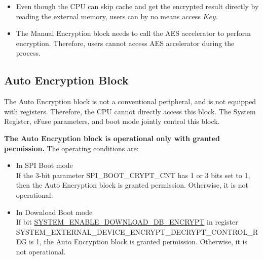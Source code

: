 \documentclass[main\_\_EN.tex]{subfiles}
\begin{document}
\begin{tiplisting}
\vspace{-2em}
\begin{itemize}
\item Even though the CPU can skip cache and get the encrypted result directly by reading the external memory, users can by no means access \begin{math}Key\end{math}.

\item The Manual Encryption block needs to call the AES accelerator to perform encryption. Therefore, users cannot access AES accelerator during the process.
\end{itemize}
\end{tiplisting}

\subsection{Auto Encryption Block}
The Auto Encryption block is not a conventional peripheral, and is not equipped with registers. Therefore, the CPU cannot directly access this block. The System Register, eFuse parameters, and boot mode jointly control this block.

\textbf{The Auto Encryption block is operational only with granted permission.} The operating conditions are:

\begin{itemize}
    \item In SPI Boot mode\\
If the 3-bit parameter SPI\_BOOT\_CRYPT\_CNT has 1 or 3 bits set to 1, then the Auto Encryption block is granted permission. Otherwise, it is not operational.

    \item In Download Boot mode\\
If bit \hyperref[fielddesc:SYSTEMENABLEDOWNLOADDBENCRYPT]{SYSTEM\_ENABLE\_DOWNLOAD\_DB\_ENCRYPT} in register\\ SYSTEM\_EXTERNAL\_DEVICE\_ENCRYPT\_DECRYPT\_CONTROL\_REG is 1, the Auto Encryption block is granted permission. Otherwise, it is not operational.
\end{itemize}
\end{document}
